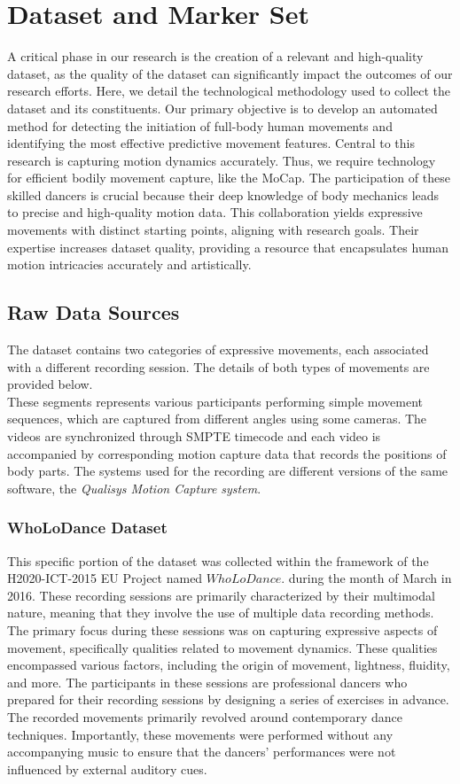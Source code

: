 \chapter{Dataset and Marker Set}
A critical phase in our research is the creation of a relevant and high-quality dataset, 
as the quality of the dataset can significantly impact the outcomes of our research efforts.
Here, we detail the technological methodology used to collect the dataset and its constituents.
Our primary objective is to develop an automated method for detecting the initiation of full-body human movements and identifying the most effective predictive movement features.
Central to this research is capturing motion dynamics accurately.
Thus, we require technology for efficient bodily movement capture, like the MoCap.
The participation of these skilled dancers is crucial because their deep knowledge of body mechanics leads to precise and high-quality motion data.
This collaboration yields expressive movements with distinct starting points, aligning with research goals.
Their expertise increases dataset quality, providing a resource that encapsulates human motion intricacies accurately and artistically.

\section{Raw Data Sources}
\label{sec:dataset}
The dataset contains two categories of expressive movements, each associated with a different recording session.
The details of both types of movements are provided below.\\
These segments represents various participants performing simple movement sequences, which are captured from different angles using some cameras.
The videos are synchronized through SMPTE timecode and each video is accompanied by corresponding motion capture data that records the positions of body parts.
The systems used for the recording are different versions of the same software, the \textit{Qualisys Motion Capture system}.


\subsection{WhoLoDance Dataset}
This specific portion of the dataset was collected within the framework of the H2020-ICT-2015 EU Project named $WhoLoDance$.
during the month of March in 2016.
These recording sessions are primarily characterized by their multimodal nature, 
meaning that they involve the use of multiple data recording methods. 
The primary focus during these sessions was on capturing expressive aspects of movement, 
specifically qualities related to movement dynamics. These qualities encompassed various factors, 
including the origin of movement, lightness, fluidity, and more.
The participants in these sessions are professional dancers 
who prepared for their recording sessions by designing a series of exercises in advance. 
The recorded movements primarily revolved around contemporary dance techniques. 
Importantly, these movements were performed without any accompanying music to ensure that 
the dancers' performances were not influenced by external auditory cues.


